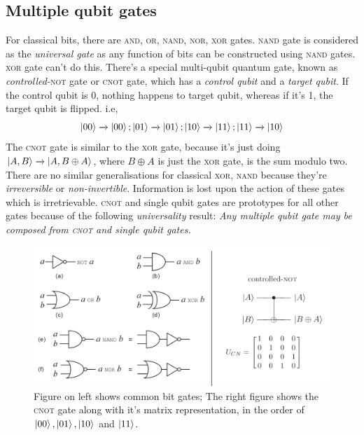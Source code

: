 \subsection{Multiple qubit gates}
For classical bits, there are \textsc{and, or, nand, nor, xor} gates. \textsc{nand} gate is considered as the \textit{universal gate} as any function of bits can be constructed using \textsc{nand} gates. \textsc{xor} gate can't do this. There's a special multi-qubit quantum gate, known as \textit{controlled-}\textsc{not} gate or \textsc{cnot} gate, which has a \textit{control qubit} and a \textit{target qubit}. If the control qubit is 0, nothing happens to target qubit, whereas if it's 1, the target qubit is flipped. i.e,
\begin{equation}
    \ket{00} \xrightarrow{} \ket{00}; \ket{01} \xrightarrow{} \ket{01};
    \ket{10} \xrightarrow{} \ket{11}; \ket{11} \xrightarrow{} \ket{10}
\end{equation}
The \textsc{cnot} gate is similar to the \textsc{xor} gate, because it's just doing $\ket{A, B} \xrightarrow[]{} \ket{A, B\oplus A}$, where $B\oplus A$ is just the \textsc{xor} gate, is the sum modulo two. There are no similar generalisations for classical \textsc{xor, nand} because they're \textit{irreversible} or \textit{non-invertible}. Information is lost upon the action of these gates which is irretrievable. \textsc{cnot} and single qubit gates are prototypes for all other gates because of the following \textit{universality} result: \textit{Any multiple qubit gate may be composed from \textsc{cnot} and single qubit gates.} 
\begin{figure}[H]
    \centering
    \includegraphics[width=\textwidth]{images/multi_gates.png}
    \caption{Figure on left shows common bit gates; The right figure shows the \textsc{cnot} gate along with it's matrix representation, in the order of $\ket{00}, \ket{01}, \ket{10}$ and $\ket{11}$.}
    \label{fig:enter-label}
\end{figure}

